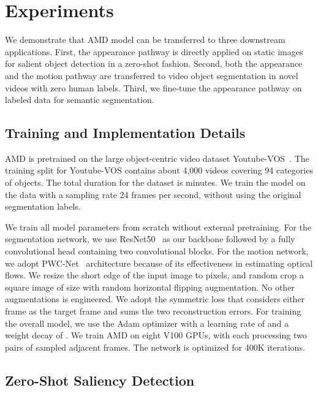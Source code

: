\def\imw#1#2{\texttt{[image: \#1]}}
\def\imh#1#2{\texttt{[image: \#1]}}
\def\imwh#1#2#3{\texttt{[image: \#1]}}


\section{Experiments}
\label{sec:exp}




We demonstrate that AMD model can be transferred to three downstream applications.
First,  the appearance pathway is directly applied on static images for salient object detection in a zero-shot fashion.
Second, both the appearance and the motion pathway are transferred to video object segmentation in novel videos with zero human labels.
Third, we fine-tune the appearance pathway on labeled data for semantic segmentation. 

\subsection{Training and Implementation Details}
\label{sec:imp}

AMD is pretrained on the large object-centric video dataset Youtube-VOS~\cite{xu2018youtube}.
The training split for Youtube-VOS contains about 4,000 videos covering 94 categories of objects. The total duration for the dataset is  minutes.
We train the model on the data with a sampling rate 24 frames per second, without using the original segmentation labels.

We train all model parameters from scratch without external pretraining. For the segmentation network, we use ResNet50~\cite{he2016deep} as our backbone followed by a fully convolutional head containing two convolutional blocks. For the motion network, we adopt PWC-Net~\cite{sun2018pwc} architecture because of its effectiveness in estimating optical flows. 
We resize the short edge of the input image to  pixels, and random crop a square image of size  with random horizontal flipping augmentation.
No other augmentations is engineered.
We adopt the symmetric loss that considers either frame as the target frame and sums the two reconstruction errors.
For training the overall model, we use the Adam optimizer with a learning rate of  and a weight decay of . 
We train AMD on eight V100 GPUs, with each processing two pairs of sampled adjacent frames.
The network is optimized for 400K iterations.


\subsection{Zero-Shot Saliency Detection}
\label{sec:saliency}

